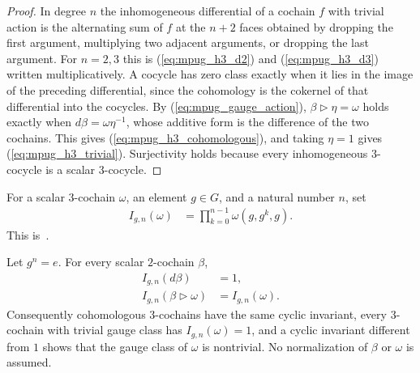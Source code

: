 \begin{proof}\leanok
    In degree $n$ the inhomogeneous differential of a cochain $f$ with
    trivial action is the alternating sum of $f$ at the $n+2$ faces
    obtained by dropping the first argument, multiplying two adjacent
    arguments, or dropping the last argument. For $n=2,3$ this is
    (\ref{eq:mpug_h3_d2}) and (\ref{eq:mpug_h3_d3}) written multiplicatively.
    A cocycle has zero class exactly when it lies in the image of the
    preceding differential, since the cohomology is the cokernel of that
    differential into the cocycles. By (\ref{eq:mpug_gauge_action}),
    $\beta\mathbin{\triangleright}\eta=\omega$ holds exactly when
    $d\beta=\omega\eta^{-1}$, whose additive form is the difference of the
    two cochains. This gives (\ref{eq:mpug_h3_cohomologous}), and taking
    $\eta=1$ gives (\ref{eq:mpug_h3_trivial}). Surjectivity holds because
    every inhomogeneous $3$-cocycle is a scalar $3$-cocycle.
\end{proof}

\begin{definition}
    \label{def:mpug_cyclic_invariant}
    \leanok
    For a scalar $3$-cochain $\omega$, an element $g\in G$, and a natural
    number $n$, set
    \begin{align}
        I_{g,n}(\omega)
         & =\prod_{k=0}^{n-1}\omega(g,g^k,g).
        \label{eq:mpug_cyclic_invariant}
    \end{align}
    This is~\cite[``Cyclic invariant of a scalar
        three-cochain'']{QICLean2026Blueprint}.
\end{definition}

\begin{lemma}
    \label{thm:mpug_cyclic_invariant_gauge}
    \leanok
    Let $g^n=e$. For every scalar $2$-cochain $\beta$,
    \begin{align}
        I_{g,n}(d\beta)                              & =1,               \\
        I_{g,n}(\beta\mathbin{\triangleright}\omega) & =I_{g,n}(\omega).
    \end{align}
    Consequently cohomologous $3$-cochains have the same cyclic invariant,
    every $3$-cochain with trivial gauge class has $I_{g,n}(\omega)=1$, and a
    cyclic invariant different from $1$ shows that the gauge class of
    $\omega$ is nontrivial. No normalization of $\beta$ or $\omega$ is
    assumed.
\end{lemma}

